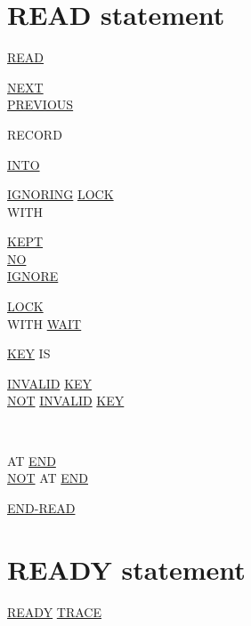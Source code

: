 \documentclass[a4paper,oneside,svgnames]{scrbook}
\makeatletter
\newcommand{\key}[1]{\underline{#1}}
\newcommand{\miscext}[1]{%
  \colorbox{blue!50}{#1}}
\newenvironment{0-1}{$\left[ \begin{tabular}{@{}l@{}}}{\end{tabular} \right]$}
\newenvironment{1=}{$\left\{ \begin{tabular}{@{}l@{}}}{\end{tabular} \right\}$}
\newenvironment{1+}{$\left\{\left| \begin{tabular}{@{}l@{}}}{\end{tabular} \right|\right\}$}
\makeatother
\begin{document}

\section{READ statement}

\key{READ} \filename
\begin{0-1}
  \key{NEXT} \\
  \key{PREVIOUS}
\end{0-1}
RECORD
\begin{0-1}
  \key{INTO} \identifier
\end{0-1}

\begin{0-1}
  \key{IGNORING} \key{LOCK} \\

  WITH
  \begin{1=}
    \key{KEPT} \\
    \key{NO} \\
    \key{IGNORE} \\
  \end{1=}
  \key{LOCK} \\

  WITH \key{WAIT}
\end{0-1}

\begin{0-1}
  \key{KEY} IS \identifier
\end{0-1}

\begin{0-1}
  \begin{1+}
    \key{INVALID} \key{KEY} \imperativestatement \\
    \key{NOT} \key{INVALID} \key{KEY} \imperativestatement
  \end{1+} \\

  \begin{1+}
    AT \key{END} \imperativestatement \\
    \key{NOT} AT \key{END} \imperativestatement
  \end{1+}
\end{0-1}

\begin{0-1}
  \key{END-READ}
\end{0-1}

\section{READY statement}

\miscext{\key{READY} \key{TRACE}}
\end{document}
